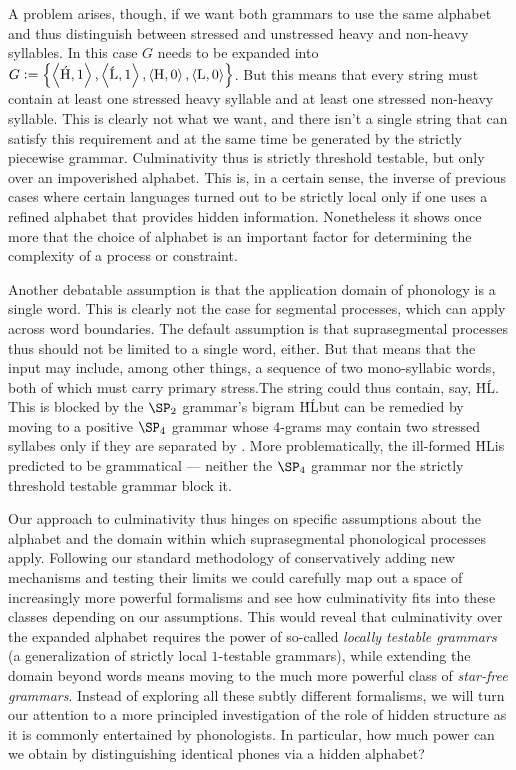 A problem arises, though, if we want both grammars to use the same alphabet and thus distinguish between stressed and unstressed heavy and non-heavy syllables.
In this case $G$ needs to be expanded into
\(
    G \mathrel{\mathop:}= \left \{ 
        \left \langle \mathit{\text{\'H}},1 \right \rangle ,
        \left \langle \mathit{\text{\'L}},1 \right \rangle ,
        \left \langle \mathit{\text{H}},0 \right \rangle ,
        \left \langle \mathit{\text{L}},0 \right \rangle 
     \right \}
\).
But this means that every string must contain at least one stressed heavy syllable and at least one stressed non-heavy syllable.
This is clearly not what we want, and there isn't a single string that can satisfy this requirement and at the same time be generated by the strictly piecewise grammar.
Culminativity thus is strictly threshold testable, but only over an impoverished alphabet.
This is, in a certain sense, the inverse of previous cases where certain languages turned out to be strictly local only if one uses a refined alphabet that provides hidden information.
Nonetheless it shows once more that the choice of alphabet is an important factor for determining the complexity of a process or constraint.

Another debatable assumption is that the application domain of phonology is a single word.
This is clearly not the case for segmental processes, which can apply across word boundaries.
The default assumption is that suprasegmental processes thus should not be limited to a single word, either.
But that means that the input may include, among other things, a sequence of two mono-syllabic words, both of which must carry primary stress.The string could thus contain, say, \LeftEdge \'H\RightEdge\LeftEdge \'L\RightEdge.
This is blocked by the $\SP_2$ grammar's bigram \'H\'L\@ but can be remedied by moving to a positive $\SP_4$ grammar whose $4$-grams may contain two stressed syllabes only if they are separated by \RightEdge\LeftEdge.
More problematically, the ill-formed \LeftEdge \'H\RightEdge\LeftEdge L\RightEdge is predicted to be grammatical --- neither the $\SP_4$ grammar nor the strictly threshold testable grammar block it.

Our approach to culminativity thus hinges on specific assumptions about the alphabet and the domain within which suprasegmental phonological processes apply.
Following our standard methodology of conservatively adding new mechanisms and testing their limits we could carefully map out a space of increasingly more powerful formalisms and see how culminativity fits into these classes depending on our assumptions.
This would reveal that culminativity over the expanded alphabet requires the power of so-called \emph{locally testable grammars} (a generalization of strictly local $1$-testable grammars), while extending the domain beyond words means moving to the much more powerful class of \emph{star-free grammars}.
Instead of exploring all these subtly different formalisms, we will turn our attention to a more principled investigation of the role of hidden structure as it is commonly entertained by phonologists.
In particular, how much power can we obtain by distinguishing identical phones via a hidden alphabet?

